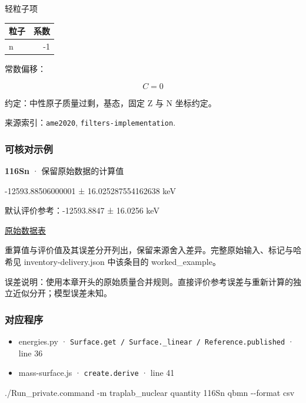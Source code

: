 \documentclass[
  11pt,
  letterpaper,
]{article}
\newenvironment{Shaded}{}{}
\newcommand{\AttributeTok}[1]{\textcolor[rgb]{0.49,0.56,0.16}{#1}}
\newcommand{\ExtensionTok}[1]{#1}
\newcommand{\NormalTok}[1]{#1}
\providecommand{\tightlist}{%
  \setlength{\itemsep}{0pt}\setlength{\parskip}{0pt}}
\begin{document}
轻粒子项

\begin{longtable}[]{@{}lr@{}}
\toprule\noalign{}
粒子 & 系数 \\
\midrule\noalign{}
\endhead
\bottomrule\noalign{}
\endlastfoot
n & -1 \\
\end{longtable}

常数偏移：

\[
C=0
\]

约定：中性原子质量过剩，基态，固定 Z 与 N 坐标约定。

来源索引：\texttt{ame2020}, \texttt{filters-implementation}.

\subsubsection{可核对示例}\label{ux53efux6838ux5bf9ux793aux4f8b-16}

\textbf{116Sn} · 保留原始数据的计算值

-12593.88506000001 ± 16.025287554162638 keV

默认评价参考：-12593.8847 ± 16.0256 keV

\href{https://www-nds.iaea.org/amdc/ame2020/rct1.mas20.txt}{原始数据表}

重算值与评价值及其误差分开列出，保留来源舍入差异。完整原始输入、标记与哈希见
inventory-delivery.json 中该条目的 worked\_example。

误差说明：使用本章开头的原始质量合并规则。直接评价参考误差与重新计算的独立近似分开；模型误差未知。

\subsubsection{对应程序}\label{ux5bf9ux5e94ux7a0bux5e8f-16}

\begin{itemize}
\tightlist
\item
  energies.py ·
  \texttt{Surface.get\ /\ Surface.\_linear\ /\ Reference.published} ·
  line 36
\item
  mass-surface.js · \texttt{create.derive} · line 41
\end{itemize}

\begin{Shaded}
\begin{Highlighting}[]
\ExtensionTok{./Run\_private.command} \AttributeTok{{-}m}\NormalTok{ traplab\_nuclear quantity 116Sn qbmn }\AttributeTok{{-}{-}format}\NormalTok{ csv}
\end{Highlighting}
\end{Shaded}
\end{document}
